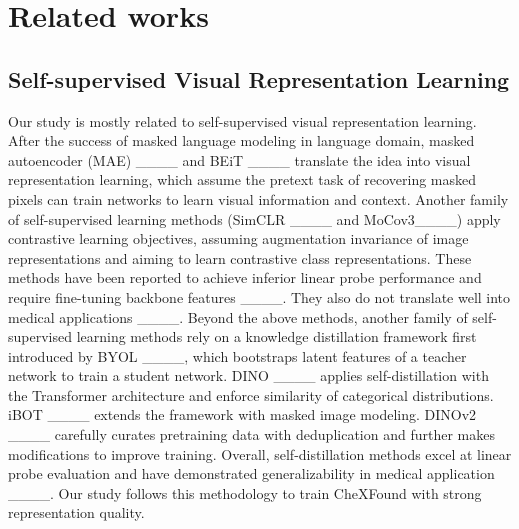 \section{Related works}
\subsection{Self-supervised Visual Representation Learning}
Our study is mostly related to self-supervised visual representation learning. After the success of masked language modeling in language domain, masked autoencoder (MAE) ____ and BEiT ____ translate the idea into visual representation learning, which assume the pretext task of recovering masked pixels can train networks to learn visual information and context. Another family of self-supervised learning methods (SimCLR ____ and MoCov3____) apply contrastive learning objectives, assuming augmentation invariance of image representations and aiming to learn contrastive class representations. These methods have been reported to achieve inferior linear probe performance and require fine-tuning backbone features ____. They also do not translate well into medical applications ____. Beyond the above methods, another family of self-supervised learning methods rely on a knowledge distillation framework first introduced by BYOL ____, which bootstraps latent features of a teacher network to train a student network. DINO ____ applies self-distillation with the Transformer architecture and enforce similarity of categorical distributions. iBOT ____ extends the framework with masked image modeling. DINOv2 ____ carefully curates pretraining data with deduplication and further makes modifications to improve training. Overall, self-distillation methods excel at linear probe evaluation and have demonstrated generalizability in medical application ____. Our study follows this methodology to train CheXFound with strong representation quality.

